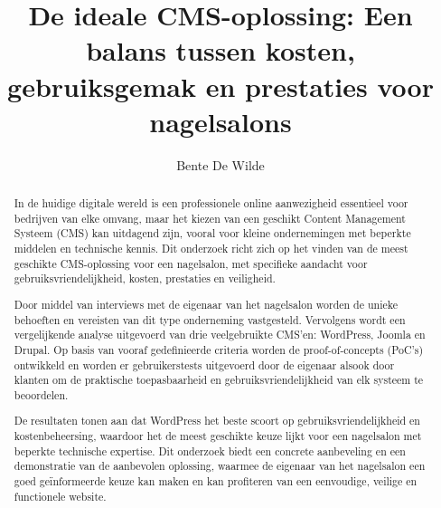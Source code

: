\documentclass{hogent-article}
\title{De ideale CMS-oplossing: Een balans tussen kosten, gebruiksgemak en prestaties voor nagelsalons}
\author{Bente De Wilde}
\begin{document}
\begin{abstract}
    In de huidige digitale wereld is een professionele online aanwezigheid essentieel voor bedrijven van elke omvang, maar het kiezen van een geschikt Content Management Systeem (CMS) kan uitdagend zijn, vooral voor kleine ondernemingen met beperkte middelen en technische kennis. Dit onderzoek richt zich op het vinden van de meest geschikte CMS-oplossing voor een nagelsalon, met specifieke aandacht voor gebruiksvriendelijkheid, kosten, prestaties en veiligheid.
    
    Door middel van interviews met de eigenaar van het nagelsalon worden de unieke behoeften en vereisten van dit type onderneming vastgesteld. Vervolgens wordt een vergelijkende analyse uitgevoerd van drie veelgebruikte CMS’en: WordPress, Joomla en Drupal. Op basis van vooraf gedefinieerde criteria worden de proof-of-concepts (PoC's) ontwikkeld en worden er gebruikerstests uitgevoerd door de eigenaar alsook door klanten om de praktische toepasbaarheid en gebruiksvriendelijkheid van elk systeem te beoordelen.
    
    De resultaten tonen aan dat WordPress het beste scoort op gebruiksvriendelijkheid en kostenbeheersing, waardoor het de meest geschikte keuze lijkt voor een nagelsalon met beperkte technische expertise. Dit onderzoek biedt een concrete aanbeveling en een demonstratie van de aanbevolen oplossing, waarmee de eigenaar van het nagelsalon een goed geïnformeerde keuze kan maken en kan profiteren van een eenvoudige, veilige en functionele website.
\end{abstract}

\tableofcontents



\printbibliography[heading=bibintoc]

\newpage
\appendix

\end{document}
